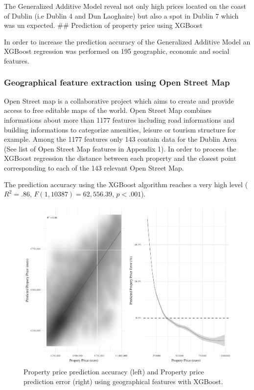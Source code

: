 \documentclass[]{elsarticle} %
\begin{document}
The Generalized Additive Model reveal not only high prices located on
the coast of Dublin (i.e Dublin 4 and Dun Laoghaire) but also a spot in
Dublin 7 which was un expected. \#\# Prediction of property price using
XGBoost

In order to increase the prediction accuracy of the Generalized Additive
Model an XGBoost regression was performed on 195 geographic, economic
and social features.

\subsubsection{Geographical feature extraction using Open Street
Map}\label{geographical-feature-extraction-using-open-street-map}

Open Street map is a collaborative project which aims to create and
provide access to free editable maps of the world. Open Street Map
combines informations about more than 1177 features including road
informations and building informations to categorize amenities, leisure
or tourism structure for example. Among the 1177 features only 143
contain data for the Dublin Area (See list of Open Street Map features
in Appendix 1). In order to process the XGBoost regression the distance
between each property and the closest point corresponding to each of the
143 relevant Open Street Map.

The prediction accuracy using the XGBoost algorithm reaches a very high
level (\(R^2 = .86\), \(F(1, 10387) = 62,556.39\), \(p < .001\)).

\begin{figure}[H]
\includegraphics{property_price_paper_new_files/figure-latex/OSM-features-xgb-1} \caption{Property price prediction accuracy (left) and Property price prediction error (right) using geographical features with XGBoost.}\label{fig:OSM-features-xgb}
\end{figure}
\end{document}
